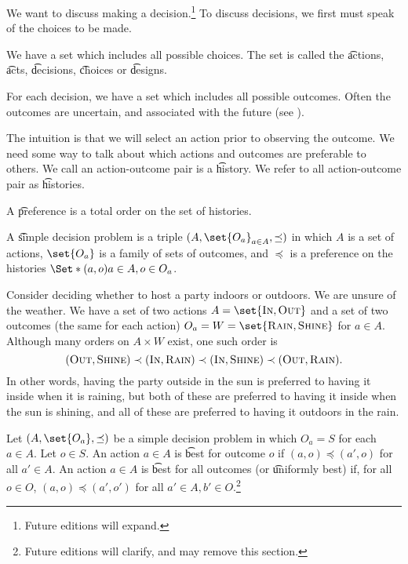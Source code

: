

We want to discuss making a decision.\footnote{Future editions will expand.}
To discuss decisions, we first must speak of the choices to be made.


We have a set which includes all possible choices.
The set is called the \t{actions}, \t{acts}, \t{decisions}, \t{choices} or \t{designs}.

For each decision, we have a set which includes all possible outcomes.
Often the outcomes are uncertain, and associated with the future (see ).

The intuition is that we will select an action prior to observing the outcome.
We need some way to talk about which actions and outcomes are preferable to others.
We call an action-outcome pair is a \t{history}.
We refer to all action-outcome pair as \t{histories}.

A \t{preference} is a total order on the set of histories.

A \t{simple decision problem} is a triple $(A, \set{O_a}_{a \in A}, \preceq)$ in which $A$ is a set of actions, $\set{O_a}$ is a family of sets of outcomes, and $\preceq$ is a preference on the histories $\Set*{(a, o)}{a \in A, o \in O_a}$.



Consider deciding whether to host a party indoors or outdoors.
We are unsure of the weather.
We have a set of two actions $A = \set{\textsc{In}, \textsc{Out}}$ and a set of two outcomes (the same for each action) $O_a = W = \set{\textsc{Rain}, \textsc{Shine}}$ for $a \in A$.
Although many orders on $A \times W$ exist, one such order is
\[
	(\textsc{Out}, \textsc{Shine}) \prec (\textsc{In}, \textsc{Rain}) \prec (\textsc{In}, \textsc{Shine}) \prec (\textsc{Out}, \textsc{Rain}).
\]
In other words, having the party outside in the sun is preferred to having it inside when it is raining, but both of these are preferred to having it inside when the sun is shining, and all of these are preferred to having it outdoors in the rain.


Let $(A, \set{O_a}, \preceq)$ be a simple decision problem in which $O_a = S$ for each $a \in A$.
Let $o \in S$.
An action $a \in A$ is \t{best for outcome $o$} if $(a, o) \preceq (a', o)$ for all $a' \in A$.
An action $a \in A$ is \t{best for all outcomes} (or \t{uniformly best}) if, for all $o \in O$, $(a, o) \preceq (a', o')$ for all $a' \in A, b' \in O$.\footnote{Future editions will clarify, and may remove this section.}

